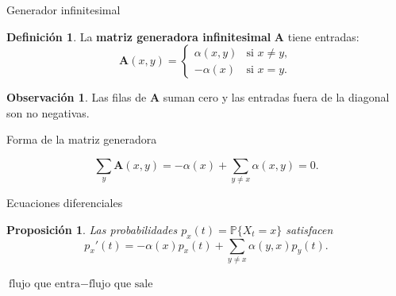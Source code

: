 \documentclass[aspectratio=169]{beamer}
\theoremstyle{plain}
\newtheorem{proposicion}{Proposición}
\theoremstyle{definition}
\newtheorem{definicion}{Definición}
\newtheorem{observacion}{Observación}
\newcommand{\A}{\mathbf{A}}
\newcommand{\Prob}{\mathbb{P}}
\newcommand{\1}{\mathbf{1}}
\begin{document}
\begin{frame}{Generador infinitesimal}
  \begin{definicion}
    La \textbf{matriz generadora infinitesimal} $\A$ tiene entradas:
    \[ \A(x,y) = \begin{cases}
      \alpha(x,y) & \text{si } x \neq y,\\
      -\alpha(x) & \text{si } x = y.
    \end{cases} \]
  \end{definicion}

  \begin{observacion}
    Las filas de $\A$ suman cero y las entradas fuera de la diagonal son no negativas.
  \end{observacion}
\end{frame}

\begin{frame}{Forma de la matriz generadora}
  \begin{center}
  \end{center}

  \vspace{0.3cm}
  \[
    \sum_y \A(x,y) = -\alpha(x) + \sum_{y\neq x} \alpha(x,y) = 0.
  \]
\end{frame}

\begin{frame}{Ecuaciones diferenciales}
  \begin{proposicion}
    Las probabilidades $p_x(t) = \Prob\{X_t = x\}$ satisfacen
    \[ p_x'(t) = -\alpha(x)p_x(t) + \sum_{y \neq x} \alpha(y,x)p_y(t). \]
  \end{proposicion}

  \vspace{0.3cm}
  \begin{center}
    \Large
    $\text{flujo que entra} - \text{flujo que sale}$
  \end{center}
\end{frame}
\end{document}
